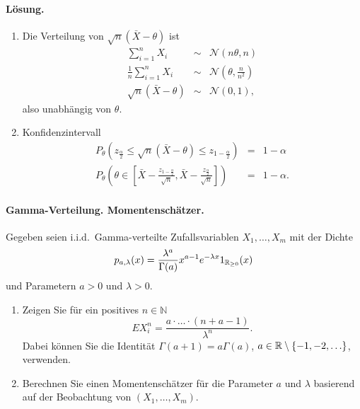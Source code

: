 \paragraph*{Lösung.}
\begin{enumerate}

    \item Die Verteilung von $\sqrt{n} \left( \bar X -\theta \right)$ ist
        \begin{eqnarray*}
            \sum_{i=1}^{n} X_i &\sim& \mathcal N \left( n\theta, n \right) \\
            \frac{1}{n} \sum_{i=1}^{n} X_i &\sim& \mathcal N \left( \theta, \frac{ n}{n^2} \right) \\
            \sqrt{n}\left( \bar X -\theta \right) & \sim & \mathcal N \left( 0, 1 \right),
        \end{eqnarray*}
        also unabhängig von $\theta$.
    \item Konfidenzintervall
        \begin{eqnarray*}
            P_\theta \left( z_{\frac{\alpha}{2}} \leq \sqrt{n}\left( \bar X -\theta \right) \leq z_{1-\frac{\alpha}{2}}  \right) &=&  1-\alpha \\
            P_\theta \left( \theta\in \left[ \bar X - \frac{z_{1-\frac{\alpha}{2}}}{\sqrt{n}}, \bar X - \frac{z_{\frac{\alpha}{2}}}{\sqrt{n}} \right] \right) &=&  1-\alpha.
        \end{eqnarray*}

\end{enumerate}



\paragraph{Gamma-Verteilung. Momentenschätzer.}
Gegeben seien i.i.d.\ Gamma-verteilte Zufallsvariablen $X_1,\ldots,X_m$ mit der Dichte
\begin{equation*}
    p_{a,\lambda}(x) = \frac{\lambda^a}{\Gamma(a)}x^{a-1}e^{-\lambda x} 1_{\mathbb R_{\geq 0}}(x)
\end{equation*}
und Parametern $a>0$ und $\lambda>0$.
\begin{enumerate}
    \item Zeigen Sie für ein positives $n\in\mathbb N$
        \begin{equation*}
            E X_i^n = \frac{a\cdot\ldots\cdot (n+a-1)}{\lambda^n}.
        \end{equation*}
        Dabei können Sie die Identität 
        $\Gamma(a+1)=a \Gamma(a)$, $a\in\mathbb R \setminus \left\{ -1,-2,\ldots \right\}$, verwenden.
    \item Berechnen Sie einen Momentenschätzer für die Parameter $a$ und $\lambda$ basierend auf
        der Beobachtung von $\left( X_1,\ldots,X_m \right)$. 
\end{enumerate}

